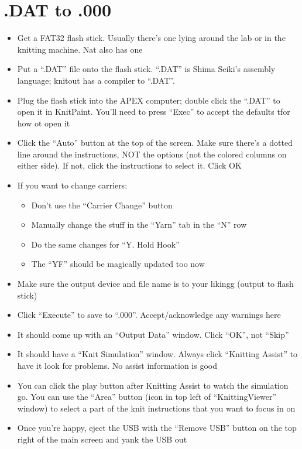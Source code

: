 \documentclass[acmsmall,screen,review,anonymous,nonacm]{acmart}
\begin{document}
\section{.DAT to .000}

\begin{itemize}
    \item Get a FAT32 flash stick. Usually there's one lying around the lab or in the knitting machine. Nat also has one
    \item Put a ``.DAT'' file onto the flash stick. ``.DAT'' is Shima Seiki's assembly language; knitout has a compiler
        to ``.DAT''.
    \item Plug the flash stick into the APEX computer; double click the ``.DAT'' to open it in KnitPaint.
        You'll need to press ``Exec'' to accept the defaults tfor how ot open it
    \item Click the ``Auto'' button at the top of the screen. Make sure there's a dotted line around
        the instructions, NOT the options (not the colored columns on either side). If not, click the instructions to select it.
        Click OK
    \item If you want to change carriers:
        \begin{itemize}
            \item Don't use the ``Carrier Change'' button
            \item Manually change the stuff in the ``Yarn'' tab in the ``N'' row
            \item Do the same changes for ``Y. Hold Hook''
            \item The ``YF'' should be magically updated too now
        \end{itemize}
    \item Make sure the output device and file name is to your likingg (output to flash stick)
    \item Click ``Execute'' to save to ``.000''. Accept/acknowledge any warnings here
    \item It should come up with an ``Output Data'' window. Click ``OK'', not ``Skip''
    \item It should have a ``Knit Simulation'' window. Always click ``Knitting Assist'' to have it look
        for problems. No assist information is good
    \item You can click the play button after Knitting Assist to watch the simulation go. You can use
        the ``Area'' button (icon in top left of ``KnittingViewer'' window) to select a part of the
        knit instructions that you want to focus in on
    \item Once you're happy, eject the USB with the ``Remove USB'' button on the top right of the
        main screen and yank the USB out
\end{itemize}
\end{document}
